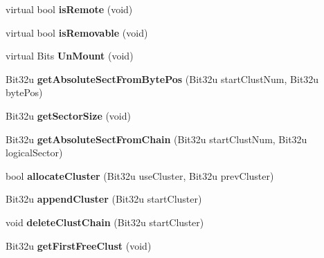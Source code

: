 \begin{DoxyCompactItemize}
\item 
\hypertarget{classfatDrive_a99edbe351256de3a70e3260fd9bf8df1}{virtual bool {\bfseries is\-Remote} (void)}\label{classfatDrive_a99edbe351256de3a70e3260fd9bf8df1}

\item 
\hypertarget{classfatDrive_a82f0f54ae1d64d62156b03c2f61f347f}{virtual bool {\bfseries is\-Removable} (void)}\label{classfatDrive_a82f0f54ae1d64d62156b03c2f61f347f}

\item 
\hypertarget{classfatDrive_ae4f1277e3b57d312737f2ece5785b2a9}{virtual Bits {\bfseries Un\-Mount} (void)}\label{classfatDrive_ae4f1277e3b57d312737f2ece5785b2a9}

\item 
\hypertarget{classfatDrive_ac865cd5b15f0a72a122783abdb9decbb}{Bit32u {\bfseries get\-Absolute\-Sect\-From\-Byte\-Pos} (Bit32u start\-Clust\-Num, Bit32u byte\-Pos)}\label{classfatDrive_ac865cd5b15f0a72a122783abdb9decbb}

\item 
\hypertarget{classfatDrive_ad2affae0064e689be43f4b081e8ae86b}{Bit32u {\bfseries get\-Sector\-Size} (void)}\label{classfatDrive_ad2affae0064e689be43f4b081e8ae86b}

\item 
\hypertarget{classfatDrive_ab31954a5996df17bbd27e17f4fbc26d6}{Bit32u {\bfseries get\-Absolute\-Sect\-From\-Chain} (Bit32u start\-Clust\-Num, Bit32u logical\-Sector)}\label{classfatDrive_ab31954a5996df17bbd27e17f4fbc26d6}

\item 
\hypertarget{classfatDrive_a77ee4b8cfb4e4fa3f3f63315c827c5aa}{bool {\bfseries allocate\-Cluster} (Bit32u use\-Cluster, Bit32u prev\-Cluster)}\label{classfatDrive_a77ee4b8cfb4e4fa3f3f63315c827c5aa}

\item 
\hypertarget{classfatDrive_a06109e670f9aea5c4dd11d07c50ae240}{Bit32u {\bfseries append\-Cluster} (Bit32u start\-Cluster)}\label{classfatDrive_a06109e670f9aea5c4dd11d07c50ae240}

\item 
\hypertarget{classfatDrive_a87019330262253fb796f8eec8ecccf5e}{void {\bfseries delete\-Clust\-Chain} (Bit32u start\-Cluster)}\label{classfatDrive_a87019330262253fb796f8eec8ecccf5e}

\item 
\hypertarget{classfatDrive_a629d48445667f2662cc360ccaef4b43e}{Bit32u {\bfseries get\-First\-Free\-Clust} (void)}\label{classfatDrive_a629d48445667f2662cc360ccaef4b43e}


\end{DoxyCompactItemize}
